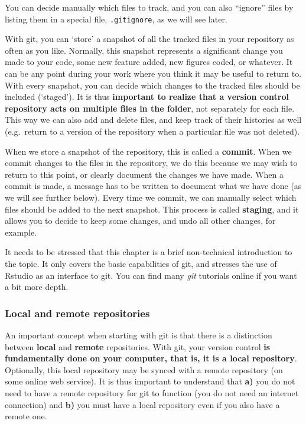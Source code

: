 \documentclass[]{book}
\let\BeginKnitrBlock\begin \let\EndKnitrBlock\end
\begin{document}
You can decide manually which files to track, and you can also ``ignore'' files by listing them in a special file, \texttt{.gitignore}, as we will see later.

With git, you can `store' a snapshot of all the tracked files in your repository as often as you like. Normally, this snapshot represents a significant change you made to your code, some new feature added, new figures coded, or whatever. It can be any point during your work where you think it may be useful to return to. With every snapshot, you can decide which changes to the tracked files should be included (`staged'). It is thus \textbf{important to realize that a version control repository acts on multiple files in the folder}, not separately for each file. This way we can also add and delete files, and keep track of their histories as well (e.g.~return to a version of the repository when a particular file was not deleted).

When we store a snapshot of the repository, this is called a \textbf{commit}. When we commit changes to the files in the repository, we do this because we may wish to return to this point, or clearly document the changes we have made. When a commit is made, a message has to be written to document what we have done (as we will see further below). Every time we commit, we can manually select which files should be added to the next snapshot. This process is called \textbf{staging}, and it allows you to decide to keep some changes, and undo all other changes, for example.

\BeginKnitrBlock{rmdreading}
It needs to be stressed that this chapter is a brief non-technical introduction to the topic. It only covers the basic capabilities of git, and stresses the use of Rstudio as an interface to git. You can find many \emph{git} tutorials online if you want a bit more depth.
\EndKnitrBlock{rmdreading}

\hypertarget{local-and-remote-repositories}{%
\subsubsection{Local and remote repositories}\label{local-and-remote-repositories}}

An important concept when starting with git is that there is a distinction between \textbf{local} and \textbf{remote} repositories. With git, your version control \textbf{is fundamentally done on your computer, that is, it is a local repository}. Optionally, this local repository may be synced with a remote repository (on some online web service). It is thus important to understand that \textbf{a)} you do not need to have a remote repository for git to function (you do not need an internet connection) and \textbf{b)} you must have a local repository even if you also have a remote one.
\end{document}
